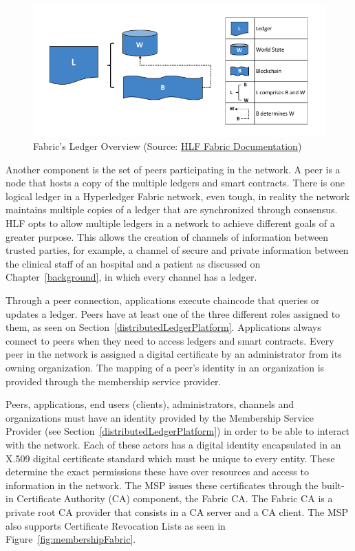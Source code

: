 \begin{figure}[ht] 
	\centering
	\includegraphics[width=1\linewidth]{imgs/ledgerFabric.png}
  \caption{\label{fig:ledgerFabric}Fabric's Ledger Overview (Source:
  \href{https://hyperledger-fabric.readthedocs.io/en/release-1.2/ledger/ledger.html}{HLF
  Fabric Documentation})}
\end{figure}

Another component is the set of peers participating in the network. A peer is a
node that hosts a copy of the multiple ledgers and smart contracts. There is
one logical ledger in a Hyperledger Fabric network, even tough, in reality the
network maintains multiple copies of a ledger that are synchronized through
consensus. HLF opts to allow multiple ledgers in a network to achieve different
goals of a greater purpose. This allows the creation of channels of information
between trusted parties, for example, a channel of secure and private
information between the clinical staff of an hospital and a patient as
discussed on Chapter~\ref{background}, in which every channel has a ledger.

Through a peer connection, applications execute chaincode that queries or
updates a ledger. Peers have at least one of the three different roles assigned
to them, as seen on Section~\ref{distributedLedgerPlatform}. Applications
always connect to peers when they need to access ledgers and smart contracts.
Every peer in the network is assigned a digital certificate by an administrator
from its owning organization. The mapping of a peer's identity in an
organization is provided through the membership service provider. 

Peers, applications, end users (clients), administrators, channels and
organizations must have an identity provided by the Membership Service Provider
(see Section~\ref{distributedLedgerPlatform}) in order to be able to interact
with the network. Each of these actors has a digital identity encapsulated in
an X.509 digital certificate standard which must be unique to every entity.
These determine the exact permissions these have over resources and access to
information in the network. The MSP issues these certificates through the
built-in Certificate Authority (CA) component, the Fabric CA. The Fabric CA is
a private root CA provider that consists in a CA server and a CA client. The
MSP also supports Certificate Revocation Lists as seen in
Figure~\ref{fig:membershipFabric}.

